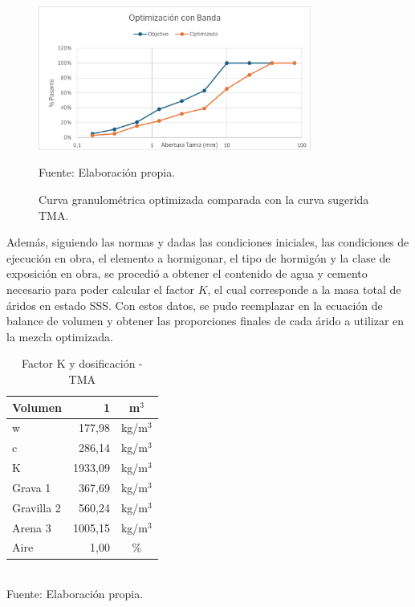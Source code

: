 \begin{figure}[H]
    \centering
    \includegraphics[width=0.8\textwidth]{GRAFICOS/opti_banda.png}
    \caption{Curva granulométrica optimizada comparada con la curva sugerida TMA.}
    Fuente: Elaboración propia.
\end{figure}

Además, siguiendo las normas y dadas las condiciones iniciales, las condiciones de ejecución en obra, el elemento a hormigonar, el tipo de hormigón y la clase de exposición en obra, se procedió a obtener el contenido de agua y cemento necesario para poder calcular el factor $K$, el cual corresponde a la masa total de áridos en estado SSS. Con estos datos, se pudo reemplazar en la ecuación de balance de volumen y obtener las proporciones finales de cada árido a utilizar en la mezcla optimizada.

\begin{table}[H]
\centering
\caption{Factor K y dosificación - TMA}
\label{tab:factor-k-tma}
\setlength{\tabcolsep}{6pt}
\renewcommand{\arraystretch}{1.15}
\small
\begin{tabular}{|l|r|c|}
\hline
\textbf{Volumen} & \textbf{1} & \textbf{m$^{3}$} \\ \hline
w          & 177,98     & kg/m$^{3}$ \\ \hline
c          & 286,14     & kg/m$^{3}$ \\ \hline
K          & 1933,09    & kg/m$^{3}$ \\ \hline
Grava 1    & 367,69     & kg/m$^{3}$ \\ \hline
Gravilla 2 & 560,24     & kg/m$^{3}$ \\ \hline
Arena 3    & 1005,15     & kg/m$^{3}$ \\ \hline
Aire       & 1,00       & \% \\ \hline
\end{tabular}
\\ Fuente: Elaboración propia.
\end{table}

